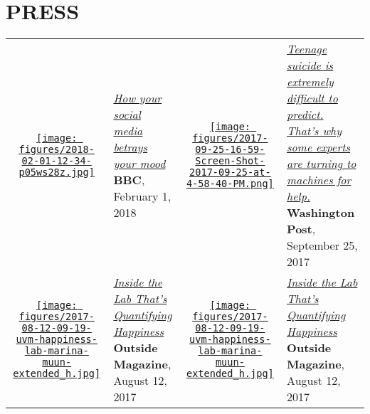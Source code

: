 \section*{PRESS}

\begin{longtable}{c p{7.5cm} c p{7.5cm} }

\parbox[c]{1.1cm}{ \href{http://www.bbc.com/future/story/20180201-how-your-social-media-betrays-your-mood}{\texttt{[image: figures/2018-02-01-12-34-p05ws28z.jpg]}} }
& \parbox[c]{7.5cm}{ {\small \textcolor{blue}{\textit{\href{http://www.bbc.com/future/story/20180201-how-your-social-media-betrays-your-mood} {How your social media betrays your mood} } } }\\ \textbf{BBC}, February 1, 2018 }  &  
\parbox[c]{1.1cm}{ \href{https://www.washingtonpost.com/news/innovations/wp/2017/09/25/teenage-suicide-is-extremely-difficult-to-predict-thats-why-some-experts-are-turning-to-machines-for-help/}{\texttt{[image: figures/2017-09-25-16-59-Screen-Shot-2017-09-25-at-4-58-40-PM.png]}} }
& \parbox[c]{7.5cm}{ {\small \textcolor{blue}{\textit{\href{https://www.washingtonpost.com/news/innovations/wp/2017/09/25/teenage-suicide-is-extremely-difficult-to-predict-thats-why-some-experts-are-turning-to-machines-for-help/} {Teenage suicide is extremely difficult to predict. That’s why some experts are turning to machines for help.} } } }\\ \textbf{Washington Post}, September 25, 2017 }  \\
\rule{0pt}{5ex} 
\parbox[c]{1.1cm}{ \href{https://www.outsideonline.com/2230891/inside-lab-thats-quantifying-happiness}{\texttt{[image: figures/2017-08-12-09-19-uvm-happiness-lab-marina-muun-extended\_h.jpg]}} }
& \parbox[c]{7.5cm}{ {\small \textcolor{blue}{\textit{\href{https://www.outsideonline.com/2230891/inside-lab-thats-quantifying-happiness} {Inside the Lab That's Quantifying Happiness} } } }\\ \textbf{Outside Magazine}, August 12, 2017 }  &  
\parbox[c]{1.1cm}{ \href{https://www.outsideonline.com/2230891/inside-lab-thats-quantifying-happiness}{\texttt{[image: figures/2017-08-12-09-19-uvm-happiness-lab-marina-muun-extended\_h.jpg]}} }
& \parbox[c]{7.5cm}{ {\small \textcolor{blue}{\textit{\href{https://www.outsideonline.com/2230891/inside-lab-thats-quantifying-happiness} {Inside the Lab That's Quantifying Happiness} } } }\\ \textbf{Outside Magazine}, August 12, 2017 }  \\

\end{longtable}
